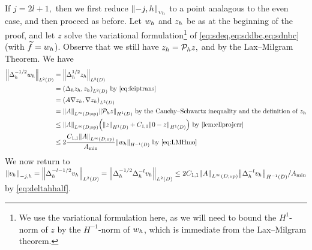 If $j=2l+1,$ then we first reduce $\Nfn{\vh}{-j,h}$ to a point analagous to the even case, and then proceed as before. Let $w_{h}$ and $z_{h}$ be as at the beginning of the proof, and let $z$ solve the variational formulation\footnote{We use the variational formulation here, as we will need to bound the $H^1$-norm of $z$ by the $H^{-1}$-norm of $w_{h}$, which is immediate from the Lax--Milgram theorem.}  of \cref{eq:sdeq,eq:sddbc,eq:sdnbc} (with $\widetilde{f} = w_{h}$). Observe that we still have $z_{h} = \mathcal P_{h} z,$ and
\beq\label{eq:LMHmo}
 \leq \frac{\NHmoD{\wh}}{\Amin}
\eeq
by the Lax--Milgram Theorem. We have
\begin{align}
\NLtD{\Deltah^{-1/2}\wh} &= \NLtD{\Deltah^{1/2} \zh}\nonumber\\
&= \IPLtD{\Deltah \zh}{\zh} \text{ by \cref{eq:feiptrans}}\\
&= \IPLtD{A \grad \zh}{\grad \zh}\nonumber\\
&= \NLiDop{A} \NHoD{\Ph z}\nonumber\text{ by the Cauchy--Schwartz inequality and the definition of } \zh\\
&\leq \NLiDop{A}\mleft(\NHoD{z} + \Cfn{1,1}\NHoD{0 - z}\mright) \text{ by \cref{lem:ellprojerr}}\nonumber\\
&\leq 2\frac{\Cfn{1,1}\NLiDop{A}}{\Amin}  \NHmoD{\wh}\text{ by \cref{eq:LMHmo}}\label{eq:deltahhalf}
\end{align}
We now return to $\Nmjh{\vh} = \NLtD{\Deltah^{-l-1/2} \vh} = \NLtD{\Deltah^{-1/2} \Deltah^{-l} \vh} \leq 2\Cfn{1,1}\NLiDop{A}\NHmoD{\Deltah^{-l} \vh}/\Amin$ by \cref{eq:deltahhalf}.

